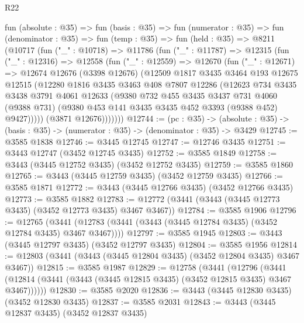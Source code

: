 \begin{lexlean}{R22}
\begin{coremodule}
  fun (absolute : @35) =>
  fun (basis : @35) =>
  fun (numerator : @35) =>
  fun (denominator : @35) =>
  fun (temp : @35) =>
  fun (held : @35) =>
  @8211
    (@10717
      (fun ("_" : @10718) =>
      @11786
        (fun ("_" : @11787) =>
        @12315
          (fun ("_" : @12316) =>
          @12558
            (fun ("_" : @12559) =>
            @12670
              (fun ("_" : @12671) =>
              @12674
                @12676
                (@3398 @12676)
                (@12509
                  @1817
                  @3435
                  @3464
                  @193
                  @12675
                  @12515
                  (@12280
                    @1816
                    @3435
                    @3463
                    @408
                    @7807
                    @12286
                    (@12623
                      @734
                      @3435
                      @3438
                      @3791
                      @4061
                      @12633
                      (@9380
                        @732
                        @455
                        @3435
                        @3437
                        @731
                        @4060
                        (@9388 @731)
                        (@9380 @453 @141 @3435 @3435 @452 @3393 (@9388 @452) @9427)))))
                (@3871 @12676)))))))
@12744 := (pc : @35) ->
  (absolute : @35) -> (basis : @35) -> (numerator : @35) -> (denominator : @35) -> @3429
@12745 := @3585 @1838
@12746 := @3445 @12745
@12747 := @12746 @3435
@12751 := @3443 @12747 (@3452 @12745 @3435)
@12752 := @3585 @1849
@12758 := @3443 (@3445 @12752 @3435) (@3452 @12752 @3435)
@12759 := @3585 @1860
@12765 := @3443 (@3445 @12759 @3435) (@3452 @12759 @3435)
@12766 := @3585 @1871
@12772 := @3443 (@3445 @12766 @3435) (@3452 @12766 @3435)
@12773 := @3585 @1882
@12783 := @12772 (@3441 (@3443 (@3445 @12773 @3435) (@3452 @12773 @3435) @3467 @3467))
@12784 := @3585 @1906
@12796 := @12765
    (@3441 (@12783 (@3441 (@3443 (@3445 @12784 @3435) (@3452 @12784 @3435) @3467 @3467))))
@12797 := @3585 @1945
@12803 := @3443 (@3445 @12797 @3435) (@3452 @12797 @3435)
@12804 := @3585 @1956
@12814 := @12803 (@3441 (@3443 (@3445 @12804 @3435) (@3452 @12804 @3435) @3467 @3467))
@12815 := @3585 @1987
@12829 := @12758
    (@3441
      (@12796
        (@3441 (@12814 (@3441 (@3443 (@3445 @12815 @3435) (@3452 @12815 @3435) @3467 @3467))))))
@12830 := @3585 @2020
@12836 := @3443 (@3445 @12830 @3435) (@3452 @12830 @3435)
@12837 := @3585 @2031
@12843 := @3443 (@3445 @12837 @3435) (@3452 @12837 @3435)

\end{coremodule}
\end{lexlean}
